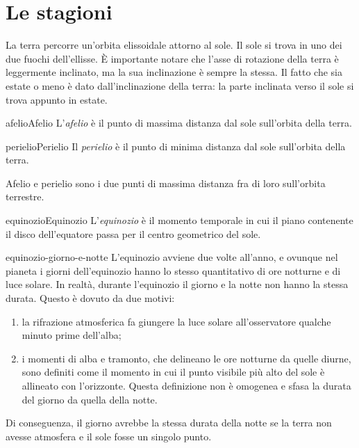 \documentclass[preview]{standalone}
\begin{document}
\genpage

\section{Le stagioni}

\begin{plainhtml}
    La terra percorre un'orbita elissoidale attorno al sole. Il sole si trova in uno dei due fuochi dell'ellisse.
    È importante notare che l'asse di rotazione della terra è leggermente inclinato, ma la sua
    inclinazione è sempre la stessa.
    Il fatto che sia estate o meno è dato dall'inclinazione della terra: la parte inclinata verso il sole si trova appunto in estate.
\end{plainhtml}

\begin{snippetdefinition}{afelio}{Afelio}
    L'\textit{afelio} è il punto di massima distanza dal sole sull'orbita
    della terra.
\end{snippetdefinition}

\begin{snippetdefinition}{perielio}{Perielio}
    Il \textit{perielio} è il punto di minima distanza dal sole sull'orbita
    della terra.
\end{snippetdefinition}

\begin{plainhtml}
    Afelio e perielio sono i due punti di massima distanza fra di loro sull'orbita terrestre.
\end{plainhtml}

\begin{snippetdefinition}{equinozio}{Equinozio}
    L'\textit{equinozio} è il momento temporale in
    cui il piano contenente il disco dell'equatore
    passa per il centro geometrico del sole.
\end{snippetdefinition}

\begin{snippet}{equinozio-giorno-e-notte}
    L'equinozio avviene due volte all'anno, e ovunque nel pianeta i giorni dell'equinozio hanno lo stesso quantitativo di ore notturne e di luce solare.
    In realtà, durante l'equinozio il giorno e la notte non hanno la stessa durata.
    Questo è dovuto da due motivi:
    \begin{enumerate}
        \item la rifrazione atmosferica fa giungere la luce solare all'osservatore qualche minuto prime dell'alba;
        \item i momenti di alba e tramonto, che delineano le ore notturne da quelle diurne, sono definiti come il momento in cui il punto visibile più alto del sole è allineato con l'orizzonte. Questa definizione non è omogenea e sfasa la durata del giorno da quella della notte.
    \end{enumerate}
    Di conseguenza, il giorno avrebbe la stessa durata della notte se la terra non avesse atmosfera e il sole fosse un singolo punto.
\end{snippet}
\end{document}
